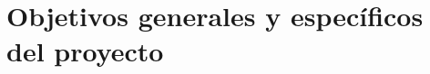\documentclass[
	11pt, %
	aspectratio=169, %
]{beamer}
\begin{document}


\section{Objetivos generales y específicos del proyecto}
\end{document}

